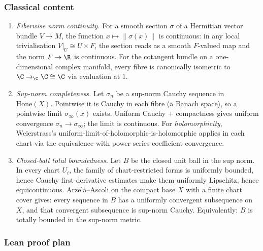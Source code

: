 \subsubsection*{Classical content}

\begin{enumerate}
\item \emph{Fiberwise norm continuity.}  For a smooth section
  \(\sigma\) of a Hermitian vector bundle \(V\to M\), the function
  \(x\mapsto\|\sigma(x)\|\) is continuous: in any local trivialisation
  \(V|_{U}\cong U\times F\), the section reads as a smooth
  \(F\)-valued map and the norm \(F\to\R\) is continuous.  For the
  cotangent bundle on a one-dimensional complex manifold, every
  fibre is canonically isometric to \(\C\to_{\C}\C\cong\C\) via
  evaluation at \(1\).
\item \emph{Sup-norm completeness.}  Let \(\sigma_{n}\) be a sup-norm
  Cauchy sequence in \(\mathrm{Hone}(X)\).  Pointwise it is
  Cauchy in each fibre (a Banach space), so a pointwise limit
  \(\sigma_{\infty}(x)\) exists.  Uniform Cauchy + compactness gives
  uniform convergence \(\sigma_{n}\to\sigma_{\infty}\); the
  limit is continuous.  For \emph{holomorphicity}, Weierstrass's
  uniform-limit-of-holomorphic-is-holomorphic applies in each chart
  via the equivalence with power-series-coefficient convergence.
\item \emph{Closed-ball total boundedness.}  Let \(B\) be the closed
  unit ball in the sup norm.  In every chart \(U_{i}\), the
  family of chart-restricted forms is uniformly bounded, hence
  Cauchy first-derivative estimates make them uniformly Lipschitz,
  hence equicontinuous.  Arzel\`a--Ascoli on the compact base \(X\)
  with a finite chart cover gives: every sequence in \(B\) has a
  uniformly convergent subsequence on \(X\), and that convergent
  subsequence is sup-norm Cauchy.  Equivalently: \(B\) is totally
  bounded in the sup-norm metric.
\end{enumerate}

\subsubsection*{Lean proof plan}

